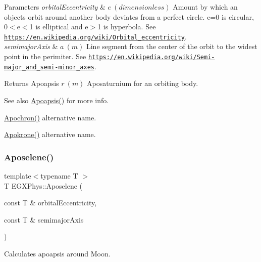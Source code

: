 \begin{DoxyParams}{Parameters}
{\em orbital\+Eccentricity} & $ e\ (dimensionless)$ Amount by which an objects orbit around another body deviates from a perfect circle. e=0 is circular, 0$<$e$<$1 is elliptical and e$>$1 is hyperbola. See \href{https://en.wikipedia.org/wiki/Orbital_eccentricity}{\tt https\+://en.\+wikipedia.\+org/wiki/\+Orbital\+\_\+eccentricity}. \\
\hline
{\em semimajor\+Axis} & $ a\ (m)$ Line segment from the center of the orbit to the widest point in the perimiter. See \href{https://en.wikipedia.org/wiki/Semi-major_and_semi-minor_axes}{\tt https\+://en.\+wikipedia.\+org/wiki/\+Semi-\/major\+\_\+and\+\_\+semi-\/minor\+\_\+axes}. \\
\hline
\end{DoxyParams}
\begin{DoxyReturn}{Returns}
Apoapsis $ r\ (m)$ Aposaturnium for an orbiting body. 
\end{DoxyReturn}
\begin{DoxySeeAlso}{See also}
\mbox{\hyperlink{group___e_g_x_phys-_apoapsis_gaf962e650bf84a568458e8eb39b1c61ba}{Apoapsis()}} for more info. 

\mbox{\hyperlink{group___e_g_x_phys-_apoapsis_gae4ea146039e6f32022321f0998e715e8}{Apochron()}} alternative name. 

\mbox{\hyperlink{group___e_g_x_phys-_apoapsis_ga98557a8d49aa129c29e652c4758334d1}{Apokrone()}} alternative name. 
\end{DoxySeeAlso}
\mbox{\label{group___e_g_x_phys-_apoapsis_gab61f3b2d6a5be3f62f5fb6dfdf802014}} 
\subsubsection{\texorpdfstring{Aposelene()}{Aposelene()}}
{\footnotesize\ttfamily template$<$typename T $>$ \\
T E\+G\+X\+Phys\+::\+Aposelene (\begin{DoxyParamCaption}\item[{const T \&}]{orbital\+Eccentricity,  }\item[{const T \&}]{semimajor\+Axis }\end{DoxyParamCaption})}



Calculates apoapsis around Moon. 


